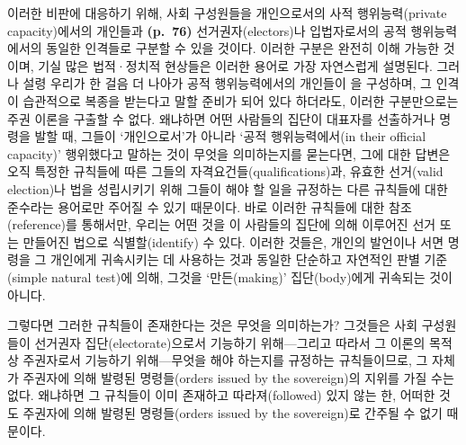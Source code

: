 이러한 비판에 대응하기 위해, 사회 구성원들을 개인으로서의 사적
행위능력(private capacity)에서의 개인들과 \textbf{(p.~76)}
선거권자(electors)나 입법자로서의 공적 행위능력에서의 동일한 인격들로
구분할 수 있을 것이다. 이러한 구분은 완전히 이해 가능한 것이며, 기실
많은 법적·정치적 현상들은 이러한 용어로 가장 자연스럽게 설명된다. 그러나
설령 우리가 한 걸음 더 나아가 공적 행위능력에서의 개인들이 을 구성하며, 그 인격이 습관적으로 복종을 받는다고
말할 준비가 되어 있다 하더라도, 이러한 구분만으로는 주권 이론을 구출할
수 없다. 왜냐하면 어떤 사람들의 집단이 대표자를 선출하거나 명령을 발할
때, 그들이 ‘개인으로서’가 아니라 ‘공적 행위능력에서(in their official
capacity)’ 행위했다고 말하는 것이 무엇을 의미하는지를 묻는다면, 그에
대한 답변은 오직 특정한 규칙들에 따른 그들의
자격요건들(qualifications)과, 유효한 선거(valid election)나 법을
성립시키기 위해 그들이 해야 할 일을 규정하는 다른 규칙들에 대한 준수라는
용어로만 주어질 수 있기 때문이다. 바로 이러한 규칙들에 대한
참조(reference)를 통해서만, 우리는 어떤 것을 이 사람들의 집단에 의해
이루어진 선거 또는 만들어진 법으로 식별할(identify) 수 있다. 이러한
것들은, 개인의 발언이나 서면 명령을 그 개인에게 귀속시키는 데 사용하는
것과 동일한 단순하고 자연적인 판별 기준(simple natural test)에 의해,
그것을 ‘만든(making)’ 집단(body)에게 귀속되는 것이 아니다.

그렇다면 그러한 규칙들이 존재한다는 것은 무엇을 의미하는가? 그것들은
사회 구성원들이 선거권자 집단(electorate)으로서 기능하기 위해---그리고
따라서 그 이론의 목적상 주권자로서 기능하기 위해---무엇을 해야 하는지를
규정하는 규칙들이므로, 그 자체가 주권자에 의해 발령된 명령들(orders
issued by the sovereign)의 지위를 가질 수는 없다. 왜냐하면 그 규칙들이
이미 존재하고 따라져(followed) 있지 않는 한, 어떠한 것도 주권자에 의해
발령된 명령들(orders issued by the sovereign)로 간주될 수 없기 때문이다.

